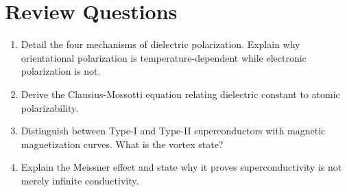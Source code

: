 \section{Review Questions}
\begin{enumerate}[leftmargin=*,itemsep=3pt]
    \item Detail the four mechanisms of dielectric polarization. Explain why orientational polarization is temperature-dependent while electronic polarization is not.
    \item Derive the Clausius-Mossotti equation relating dielectric constant to atomic polarizability.
    \item Distinguish between Type-I and Type-II superconductors with magnetic magnetization curves. What is the vortex state?
    \item Explain the Meissner effect and state why it proves superconductivity is not merely infinite conductivity.
\end{enumerate}
